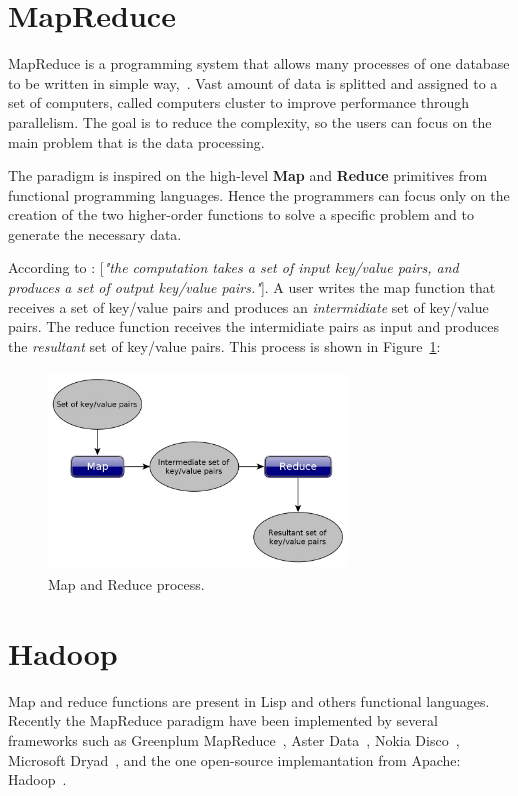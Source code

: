 \section{MapReduce}\label{section:mapreduce}
MapReduce is a programming system that allows many processes of one
database to be written in simple way,~\cite{molina:2009}. Vast amount of data
is splitted and assigned to a set of computers, called computers cluster to improve
performance through parallelism. The goal is to reduce the complexity, so the users
can focus on the main problem that is the data processing.

The paradigm is inspired on the high-level \textbf{Map} and \textbf{Reduce} primitives
from functional programming languages. Hence the programmers can focus only on the
creation of the two higher-order functions to solve a specific problem and to generate
the necessary data.

According to \cite{dean:2008}: [\textit{"the computation takes a set of input key/value pairs,
and produces a set of output key/value pairs."}]. A user writes the map function
that receives a set of key/value pairs and produces an \textit{intermidiate}
set of key/value pairs. The reduce function receives the intermidiate pairs as
input and produces the \textit{resultant} set of key/value pairs. This process is
shown in Figure~\ref{fig:mapReduce}:

\begin{figure}[htbp]
	\centering
	\includegraphics[width=300px, height=200px]{img/mapReduce.jpg}
	\caption{Map and Reduce process.}\label{fig:mapReduce}
\end{figure}

\section{Hadoop}
Map and reduce functions are present in Lisp and others functional languages. Recently
the MapReduce paradigm have been implemented by several frameworks such as Greenplum
MapReduce~\cite{PivotalGreenplum:2008, Greenplum:2008}, Aster Data~\cite{Aster:2011}, Nokia
Disco~\cite{Mundkur:2011}, Microsoft Dryad~\cite{Isard:2007}, and the one
open-source implemantation from Apache: Hadoop~\cite{hadoop}.

